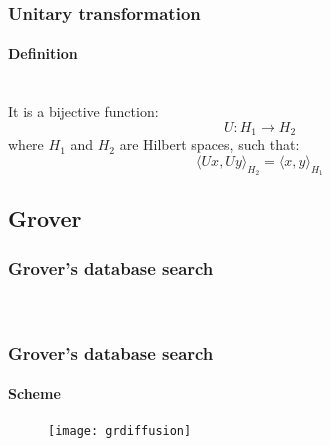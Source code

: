 \begin{frame}
	\frametitle{Unitary transformation}
		\framesubtitle{Definition}
		\vspace{-1cm}
	{\normalsize
	\hspace{0.5cm}{Unitary transformation is transformation  that preserves the inner product (isometry).}\\
	\vspace{0.5cm}
	 It is a bijective function:
	$$ U:H_1 \to H_2 $$
where $H_1$ and $H_2$ are Hilbert spaces, such that:\\
$$\langle Ux,Uy\rangle_{H_{2}}=\langle x,y\rangle _{H_{1}}$$
	}
\end{frame}

\subsection{Grover} 
\begin{frame}
	\frametitle{Grover's database search}
		\framesubtitle{}

		{\normalsize
		\\
		}
		

\end{frame}

\begin{frame}
	\frametitle{Grover's database search}
		\framesubtitle{Scheme}
	\vspace{0.5cm}
		\begin{figure}
		\centering
		\texttt{[image: grdiffusion]}
		\label{fig:grdiffusion grdiffusion}
	\end{figure}
\end{frame}

